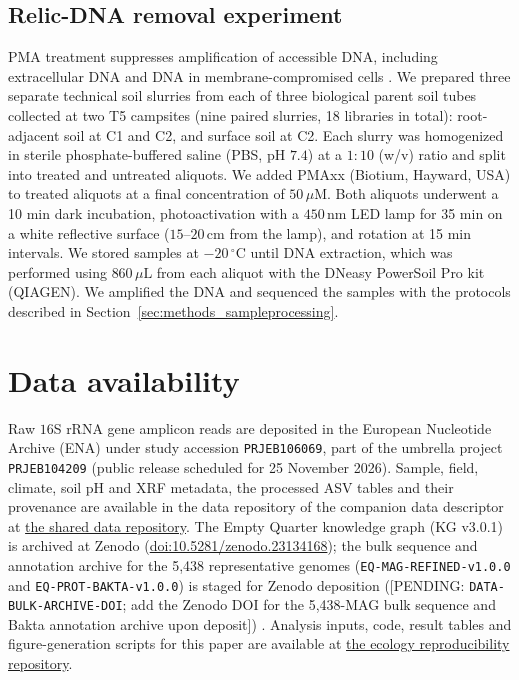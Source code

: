 \documentclass[fleqn,10pt,numbers]{olplainarticle}
\begin{document}
\subsection*{Relic-DNA removal experiment}
PMA treatment suppresses amplification of accessible DNA, including extracellular DNA and DNA in membrane-compromised cells \cite{wang2021pma,sun2023,carini2017relic}. We prepared three separate technical soil slurries from each of three biological parent soil tubes collected at two T5 campsites (nine paired slurries, 18 libraries in total): root-adjacent soil at C1 and C2, and surface soil at C2. Each slurry was homogenized in sterile phosphate-buffered saline (PBS, pH $7.4$) at a $1:10$ (w/v) ratio and split into treated and untreated aliquots. We added PMAxx (Biotium, Hayward, USA) to treated aliquots at a final concentration of $50\,\mu\mathrm{M}$. Both aliquots underwent a 10 min dark incubation, photoactivation with a $450\,\mathrm{nm}$ LED lamp for 35 min on a white reflective surface ($15$--$20\,\mathrm{cm}$ from the lamp), and rotation at 15 min intervals. We stored samples at $-20\,^{\circ}\mathrm{C}$ until DNA extraction, which was performed using $860\,\mu\mathrm{L}$ from each aliquot with the DNeasy PowerSoil Pro kit (QIAGEN). We amplified the DNA and sequenced the samples with the protocols described in Section~\ref{sec:methods_sampleprocessing}.






\section*{Data availability}
Raw $16$S rRNA gene amplicon reads are deposited in the European Nucleotide Archive (ENA) under study accession \texttt{PRJEB106069}, part of the umbrella project \texttt{PRJEB104209} (public release scheduled for 25 November 2026). Sample, field, climate, soil pH and XRF metadata, the processed ASV tables and their provenance are available in the data repository of the companion data descriptor \cite{rubalkhali_datapaper} at \href{https://github.com/bio-ontology-research-group/empty-quarter-ecology-data}{the shared data repository}. The Empty Quarter knowledge graph (KG v3.0.1) is archived at Zenodo (\href{https://doi.org/10.5281/zenodo.23134168}{doi:10.5281/zenodo.23134168}); the bulk sequence and annotation archive for the 5,438 representative genomes (\texttt{EQ-MAG-\allowbreak REFINED-\allowbreak v1.0.0} and \texttt{EQ-PROT-\allowbreak BAKTA-\allowbreak v1.0.0}) is staged for Zenodo deposition ([PENDING: \texttt{DATA-\allowbreak BULK-\allowbreak ARCHIVE-\allowbreak DOI}; add the Zenodo DOI for the 5,438-MAG bulk sequence and Bakta annotation archive upon deposit]) \cite{rubalkhali_datapaper}. Analysis inputs, code, result tables and figure-generation scripts for this paper are available at \href{https://github.com/bio-ontology-research-group/empty-quarter-ecology}{the ecology reproducibility repository}.
\end{document}

